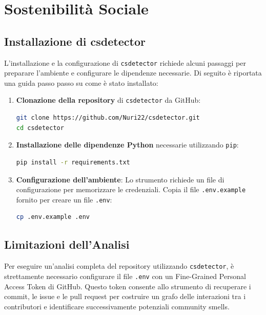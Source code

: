 \chapter{Sostenibilità Sociale}

\section{Installazione di csdetector}
L'installazione e la configurazione di \texttt{csdetector} richiede alcuni passaggi per preparare l'ambiente e configurare le dipendenze necessarie. Di seguito è riportata una guida passo passo su come è stato installato:

\begin{enumerate}
    \item \textbf{Clonazione della repository} di \texttt{csdetector} da GitHub:
    \begin{lstlisting}[language=bash, breaklines=true]
git clone https://github.com/Nuri22/csdetector.git
cd csdetector
    \end{lstlisting}
    
    \item \textbf{Installazione delle dipendenze Python} necessarie utilizzando \texttt{pip}:
    \begin{lstlisting}[language=bash, breaklines=true]
pip install -r requirements.txt
    \end{lstlisting}
    
    \item \textbf{Configurazione dell'ambiente}: Lo strumento richiede un file di configurazione per memorizzare le credenziali. Copia il file \texttt{.env.example} fornito per creare un file \texttt{.env}:
    \begin{lstlisting}[language=bash, breaklines=true]
cp .env.example .env
    \end{lstlisting}
\end{enumerate}

\section{Limitazioni dell'Analisi}
Per eseguire un'analisi completa del repository utilizzando \texttt{csdetector}, è strettamente necessario configurare il file \texttt{.env} con un Fine-Grained Personal Access Token di GitHub. Questo token consente allo strumento di recuperare i commit, le issue e le pull request per costruire un grafo delle interazioni tra i contributori e identificare successivamente potenziali community smells.

